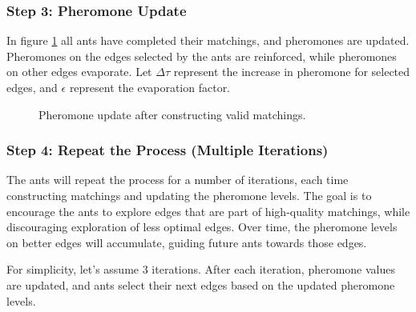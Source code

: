 \subsubsection*{Step 3: Pheromone Update}
In figure \ref{fig:Pheromone_update} all ants have completed their matchings, and pheromones are updated. Pheromones on the edges selected by the ants are reinforced, while pheromones on other edges evaporate. Let $\Delta\tau$ represent the increase in pheromone for selected edges, and $\epsilon$ represent the evaporation factor.

\begin{figure}[t]
    \centering
    \caption{Pheromone update after constructing valid matchings.}
    \label{fig:Pheromone_update}
\end{figure}

\subsubsection*{Step 4: Repeat the Process (Multiple Iterations)}
The ants will repeat the process for a number of iterations, each time constructing matchings and updating the pheromone levels. The goal is to encourage the ants to explore edges that are part of high-quality matchings, while discouraging exploration of less optimal edges. Over time, the pheromone levels on better edges will accumulate, guiding future ants towards those edges.

For simplicity, let’s assume 3 iterations. After each iteration, pheromone values are updated, and ants select their next edges based on the updated pheromone levels.

